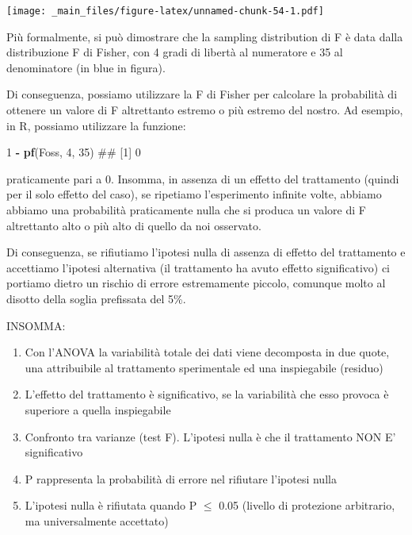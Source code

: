 \documentclass[a4paper,12pt,oneside]{book}
\providecommand{\tightlist}{%
  \setlength{\itemsep}{0pt}\setlength{\parskip}{0pt}}
\newenvironment{Shaded}{\begin{snugshade}}{\end{snugshade}}
\newcommand{\KeywordTok}[1]{\textcolor[rgb]{0.13,0.29,0.53}{\textbf{#1}}}
\newcommand{\DecValTok}[1]{\textcolor[rgb]{0.00,0.00,0.81}{#1}}
\newcommand{\StringTok}[1]{\textcolor[rgb]{0.31,0.60,0.02}{#1}}
\newcommand{\OperatorTok}[1]{\textcolor[rgb]{0.81,0.36,0.00}{\textbf{#1}}}
\newcommand{\NormalTok}[1]{#1}
\theoremstyle{definition}
\theoremstyle{definition}
\theoremstyle{definition}
\theoremstyle{remark}
\begin{document}
\texttt{[image: \_main\_files/figure-latex/unnamed-chunk-54-1.pdf]}

Più formalmente, si può dimostrare che la sampling distribution di F è
data dalla distribuzione F di Fisher, con 4 gradi di libertà al
numeratore e 35 al denominatore (in blue in figura).

Di conseguenza, possiamo utilizzare la F di Fisher per calcolare la
probabilità di ottenere un valore di F altrettanto estremo o più estremo
del nostro. Ad esempio, in R, possiamo utilizzare la funzione:

\begin{Shaded}
\begin{Highlighting}[]
\DecValTok{1} \OperatorTok{-}\StringTok{ }\KeywordTok{pf}\NormalTok{(Foss, }\DecValTok{4}\NormalTok{, }\DecValTok{35}\NormalTok{)}
\NormalTok{## [1] 0}
\end{Highlighting}
\end{Shaded}

praticamente pari a 0. Insomma, in assenza di un effetto del trattamento
(quindi per il solo effetto del caso), se ripetiamo l'esperimento
infinite volte, abbiamo abbiamo una probabilità praticamente nulla che
si produca un valore di F altrettanto alto o più alto di quello da noi
osservato.

Di conseguenza, se rifiutiamo l'ipotesi nulla di assenza di effetto del
trattamento e accettiamo l'ipotesi alternativa (il trattamento ha avuto
effetto significativo) ci portiamo dietro un rischio di errore
estremamente piccolo, comunque molto al disotto della soglia prefissata
del 5\%.

INSOMMA:

\begin{enumerate}
\def\labelenumi{\arabic{enumi}.}
\tightlist
\item
  Con l'ANOVA la variabilità totale dei dati viene decomposta in due
  quote, una attribuibile al trattamento sperimentale ed una
  inspiegabile (residuo)
\item
  L'effetto del trattamento è significativo, se la variabilità che esso
  provoca è superiore a quella inspiegabile
\item
  Confronto tra varianze (test F). L'ipotesi nulla è che il trattamento
  NON E' significativo
\item
  P rappresenta la probabilità di errore nel rifiutare l'ipotesi nulla
\item
  L'ipotesi nulla è rifiutata quando P \(\leq\) 0.05 (livello di
  protezione arbitrario, ma universalmente accettato)
\end{enumerate}
\end{document}
